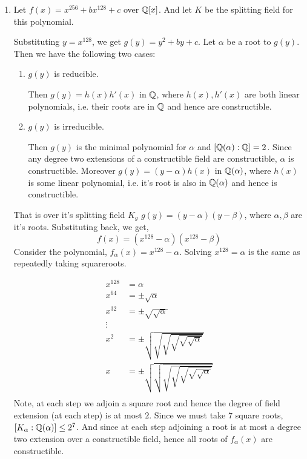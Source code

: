 \documentclass[12pt]{article}
\begin{document}
\begin{solution}
\begin{enumerate}
        \item Let $f(x) = x^{256} + bx^{128} + c$ over $\mathbb Q[x]$. And let $K$ be the splitting field for this polynomial. 
        
        Substituting $y = x^{128}$, we get $g(y) = y^2 + by + c$. Let $\alpha$ be a root to $g(y)$. Then we have the following two cases: 
        \begin{enumerate}
            \item $g(y)$ is reducible. 
            
            Then $g(y) = h(x)h'(x)$ in $\mathbb Q$, where $h(x), h'(x)$ are both linear polynomials, i.e. their roots are in $\mathbb Q$ and hence are constructible. 

            \item $g(y)$ is irreducible. 
            
            Then $g(y)$ is the minimal polynomial for $\alpha$ and $[\mathbb Q(\alpha): \mathbb Q] = 2$. Since any degree two extensions of a constructible field are constructible, $\alpha$ is constructible. Moreover $g(y) = (y-\alpha)h(x)$ in $\mathbb Q(\alpha)$, where $h(x)$ is some linear polynomial, i.e. it's root is also in $\mathbb Q(\alpha)$ and hence is constructible. 
        \end{enumerate} 
        That is over it's splitting field $K_g$ $g(y) = (y - \alpha)(y-\beta)$, where $\alpha, \beta$ are it's roots. 
        Substituting back, we get, \[f(x) = (x^{128} - \alpha)(x^{128} - \beta)\]
        Consider the polynomial, $f_{\alpha}(x) = x^{128} - \alpha$. Solving $x^{128} = \alpha$ is the same as repeatedly taking squareroots. 
        
        \begin{align*}
            x^{128} &= \alpha \\ 
            x^{64}  &= \pm \sqrt{\alpha} \\ 
            x^{32}  &= \pm \sqrt{\sqrt{\alpha}} \\ 
            \vdots \\ 
            x^{2}  &= \pm \sqrt{\sqrt{\sqrt{\sqrt{\sqrt{\sqrt{\alpha}}}}} }\\ 
            x  &= \pm \sqrt{\sqrt{\sqrt{\sqrt{\sqrt{\sqrt{\sqrt{\alpha}}}}} }}\\ 
        \end{align*}
        Note, at each step we adjoin a square root and hence the degree of field extension (at each step) is at most $2$. Since we must take $7$ square roots, $[K_{\alpha}: \mathbb Q(\alpha)] \leq 2^7$. And since at each step adjoining a root is at most a degree two extension over a constructible field, hence all roots of $f_{\alpha}(x)$ are constructible. 
        

\end{enumerate}
\end{solution}
\end{document}
